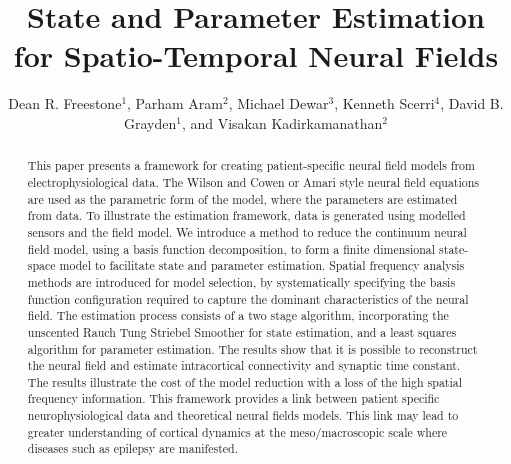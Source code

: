 \documentclass[12pt]{iopart}
\begin{document}

\title[State and Parameter Estimation for Spatio-Temporal Neural Fields]{State and Parameter Estimation for Spatio-Temporal Neural Fields}

\author{Dean R. Freestone$^1$, Parham Aram$^2$, Michael Dewar$^3$, Kenneth Scerri$^4$, David B. Grayden$^1$, and Visakan Kadirkamanathan$^2$}

\address{$^1$ Department of Electrical and Electronic Engineering, University of Melbourne, Melbourne, Vic, 3010 Australia} \address{$^2$ Department of Automatic Control and Systems Engineering, University of Sheffield, Mappin Street, Sheffield, S1 3JD, UK} \address{$^3$ Department of Applied Physics and Applied Mathematics, Columbia University, US} \address{$^4$ Ken's}  

\begin{abstract}
	This paper presents a framework for creating patient-specific neural field models from electrophysiological data. The Wilson and Cowen or Amari style neural field equations are used as the parametric form of the model, where the parameters are estimated from data. To illustrate the estimation framework, data is generated using modelled sensors and the field model. We introduce a method to reduce the continuum neural field model, using a basis function decomposition, to form a finite dimensional state-space model to facilitate state and parameter estimation. Spatial frequency analysis methods are introduced for model selection, by systematically specifying the basis function configuration required to capture the dominant characteristics of the neural field. The estimation process consists of a two stage algorithm, incorporating the unscented Rauch Tung Striebel Smoother for state estimation, and a least squares algorithm for parameter estimation. The results show that it is possible to reconstruct the neural field and estimate intracortical connectivity and synaptic time constant. The results illustrate the cost of the model reduction with a loss of the high spatial frequency information. This framework provides a link between patient specific neurophysiological data and theoretical neural fields models. This link may lead to greater understanding of cortical dynamics at the meso/macroscopic scale where diseases such as epilepsy are manifested.   
\end{abstract}

\maketitle
\end{document}
